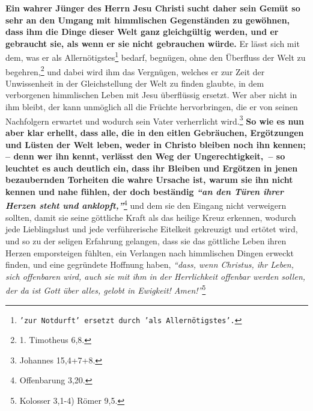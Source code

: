 \label{ref:16_05_weltliches}
\textbf{Ein wahrer Jünger des Herrn Jesu Christi sucht daher sein Gemüt so sehr
an den
Umgang mit himmlischen Gegenständen zu gewöhnen, dass ihm die Dinge dieser Welt
ganz gleichgültig werden, und er gebraucht sie, als wenn er sie nicht
gebrauchen würde.} Er lässt sich mit dem, was er als
Allernötigstes\footnote{\texttt{'zur Notdurft' ersetzt durch 'als
Allernötigstes'.}} bedarf, begnügen, ohne
den Überfluss der Welt zu begehren,\footnote{1. Timotheus 6,8.}
und dabei wird ihm das
Vergnügen, welches er zur Zeit der Unwissenheit in der Gleichstellung der Welt
zu finden glaubte, in dem verborgenen himmlischen Leben mit Jesu überflüssig
ersetzt. Wer aber nicht in ihm bleibt, der kann unmöglich all die Früchte
hervorbringen, die er von seinen Nachfolgern erwartet und wodurch sein Vater
verherrlicht wird.\footnote{Johannes 15,4+7+8.}
\label{ref:16_05_weltliches_2}
\textbf{So wie es nun aber klar erhellt,
dass alle, die in den eitlen Gebräuchen, Ergötzungen und Lüsten der Welt leben,
weder in Christo bleiben noch ihn kennen; -- denn wer ihn kennt, verlässt den
Weg der Ungerechtigkeit,~-- so leuchtet es auch deutlich ein, dass ihr Bleiben und
Ergötzen in jenen bezaubernden Torheiten die wahre Ursache ist, warum sie ihn
nicht kennen und nahe fühlen, der doch beständig
\textit{"`an den Türen ihrer Herzen
steht und anklopft,"'}}\footnote{Offenbarung 3,20.}
und dem sie den Eingang nicht
verweigern sollten, damit sie seine göttliche Kraft als das heilige Kreuz
erkennen, wodurch jede Lieblingslust und jede verführerische Eitelkeit
gekreuzigt und ertötet wird, und so zu der seligen
Erfahrung gelangen, dass sie
das göttliche Leben ihren Herzen emporsteigen fühlten, ein Verlangen nach
himmlischen Dingen erweckt finden, und eine gegründete Hoffnung haben,
\textit{"`dass,
wenn Christus, ihr Leben, sich offenbaren wird, auch sie mit ihm in der
Herrlichkeit offenbar werden sollen, der da ist Gott über alles, gelobt in
Ewigkeit! Amen!"'}\footnote{Kolosser 3,1-4) Römer 9,5.}


